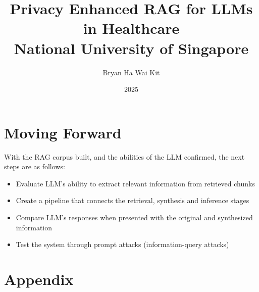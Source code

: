 \documentclass[12pt,twoside]{report}
\title{
  {Privacy Enhanced RAG for LLMs in Healthcare}\\
  {\large National University of Singapore}\\
}
\author{Bryan Ha Wai Kit}
\date{2025}
\begin{document}
\maketitle


\tableofcontents
\listoffigures
\listoftables

\newpage
{}





\section{Moving Forward}

With the RAG corpus built, and the abilities of the LLM confirmed, the next steps are as follows:
\begin{itemize}
	\item Evaluate LLM's ability to extract relevant information from retrieved chunks
	\item Create a pipeline that connects the retrieval, synthesis and inference stages
	\item Compare LLM's responses when presented with the original and synthesized information
	\item Test the system through prompt attacks (information-query attacks)
\end{itemize}


\printbibliography[title=References]
\nocite{*}
\break

\appendix
\section{Appendix}

\end{document}
